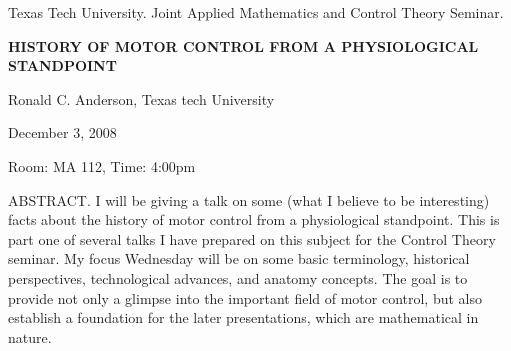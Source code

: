 \documentclass[oneside]{amsart}
\begin{document}
\begin{center}
Texas Tech University. Joint Applied Mathematics and Control Theory Seminar.
\end{center}

\begin{center}

{\LARGE \uppercase{\textbf{
History of motor control from a physiological standpoint
}}}

Ronald C. Anderson, Texas tech University

December 3, 2008

Room: MA 112, Time: 4:00pm

\end{center}

ABSTRACT. I will be giving a talk on some (what I believe to be interesting) facts about the history of motor control from a physiological standpoint.  This is part one of several talks I have prepared on this subject for the Control Theory seminar.  My focus Wednesday will be on some basic terminology, historical perspectives, technological advances, and anatomy concepts. The goal is to provide not only a glimpse into the important field of motor control, but also establish a foundation for the later presentations, which are mathematical in nature.
\end{document}
